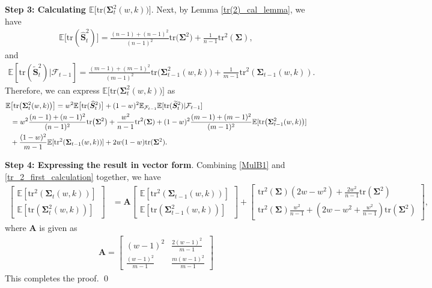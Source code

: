 \noindent
\textbf{Step 3: Calculating $\mathbb{E} \bigl[ \mathrm{tr}\bigl(\bm{\Sigma}_t^2(w, k)\bigr) \bigr]$}. Next, by Lemma \ref{tr(2)_cal_lemma}, we have
\begin{align*}
\mathbb{E}\bigl[ \mathrm{tr}(\widehat{\bm{S}}_t^2)  \bigr]= \frac{(n-1) + (n-1)^2}{(n-1)^2}\mathrm{tr}\bigl(\bm{\Sigma}^2\bigr)
   + \frac{1}{n-1}\mathrm{tr}^2(\bm{\Sigma}), 
\end{align*}
and
\begin{align*}
\mathbb{E}[\mathrm{tr}(\widetilde{\bm{S}}_t^2)|\mathcal{F}_{t-1}]=\frac{(m-1)+(m-1)^2}{(m-1)^2}\mathrm{tr}\bigl(\bm{\Sigma}_{t-1}^2(w, k)\bigr)+\frac{1}{m-1}\mathrm{tr}^2(\bm{\Sigma}_{t-1}(w, k)).
\end{align*}
Therefore, we can express $\mathbb{E} \bigl[ \mathrm{tr}\bigl(\bm{\Sigma}_t^2(w, k)\bigr) \bigr]$ as
\begin{align}
\label{tr_2_first_calculation}
\mathbb{E}& \bigl[ \mathrm{tr}\bigl(\bm{\Sigma}_t^2(w, k)\bigr) \bigr] =w^2 \mathbb{E}\bigl[ \mathrm{tr}(\widehat{\bm{S}}_t^2)  \bigr]+(1-w)^2\mathbb{E}_{\mathcal{F}_{t-1}}\mathbb{E}[\mathrm{tr}(\widetilde{\bm{S}}_t^2)|\mathcal{F}_{t-1}]
\notag \\ & =w^2 \frac{(n-1) + (n-1)^2}{(n-1)^2}\mathrm{tr}\bigl(\bm{\Sigma}^2\bigr)
   + \frac{w^2}{n-1}\mathrm{tr}^2(\bm{\Sigma})  \notag +
(1-w)^2 \frac{(m-1)+(m-1)^2}{(m-1)^2}\mathbb{E}[\mathrm{tr}\bigl(\bm{\Sigma}_{t-1}^2(w, k)\bigr)]\notag \\ 
&+\frac{(1-w)^2}{m-1}\mathbb{E} [\mathrm{tr}^2(\bm{\Sigma}_{t-1}(w, k))] +2w(1-w)\mathrm{tr}(\bm{\Sigma}^2).
\end{align}

\noindent
\textbf{Step 4: Expressing the result in vector form}. Combining \eqref{MulB1} and \eqref{tr_2_first_calculation} together, we have
\begin{align*}
\begin{bmatrix}
\mathbb{E}[\mathrm{tr}^2(\bm \Sigma_t(w,k))] \\
\mathbb{E}[\mathrm{tr}(\bm \Sigma_t^2(w,k))]
\end{bmatrix}&=\bm{A}
\begin{bmatrix}
\mathbb{E}[\mathrm{tr}^2(\bm \Sigma_{t-1}(w,k))] \\
\mathbb{E}[\mathrm{tr}(\bm \Sigma_{t-1}^2(w,k))]
\end{bmatrix}
+
\begin{bmatrix}
\mathrm{tr}^2(\bm{\Sigma})(2w-w^2)+\frac{2w^2}{n-1}\mathrm{tr}(\bm{\Sigma}^2) \\
\mathrm{tr}^2(\bm{\Sigma})\frac{w^2}{n-1}+(2w-w^2+\frac{w^2}{n-1})\mathrm{tr}(\bm{\Sigma}^2)
\end{bmatrix},
\end{align*}
where $\bm{A}$ is given as 
\begin{align*}
    \bm{A}=\begin{bmatrix}
(w - 1)^2 & \frac{2(w - 1)^2}{m - 1} \\
\frac{(w - 1)^2}{m - 1} & \frac{m(w - 1)^2}{m - 1}
\end{bmatrix}
\end{align*}
This completes the proof. \qed \\


